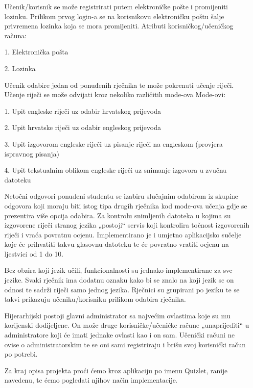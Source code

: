 Učenik/korisnik se može registrirati putem elektroničke pošte i promijeniti lozinku. Prilikom prvog login-a se na korisnikovu elektroničku poštu šalje privremena lozinka koja se mora promijeniti. 
Atributi korisničkog/učeničkog računa: 
\begin{packed_item}
\item 1. Elektronička pošta 
\item 2. Lozinka 
\end{packed_item}
Učenik odabire jedan od ponuđenih rječnika te može pokrenuti učenje riječi. 
Učenje riječi se može odvijati kroz nekoliko različitih mode-ova
Mode-ovi:
\begin{packed_item}
\item 1.	Upit engleske riječi uz odabir hrvatskog prijevoda 
\item 2.	Upit hrvatske riječi uz odabir engleskog prijevoda
\item 3.	Upit izgovorom engleske riječi uz pisanje riječi na engleskom (provjera ispravnog pisanja)
\item 4.	Upit tekstualnim oblikom engleske riječi uz snimanje izgovora u zvučnu datoteku
\end{packed_item}
Netočni odgovori ponuđeni studentu se izabiru slučajnim odabirom iz skupine odgovora koji moraju biti istog tipa drugih rječnika kod mode-ova učenja gdje se prezentira više opcija odabira. Za kontrolu snimljenih datoteka u kojima su izgovorene riječi stranog jezika „postoji“ servis koji kontrolira točnost izgovorenih riječi i vraća povratnu ocjenu. Implementirano je i umjetno aplikacijsko sučelje koje će prihvatiti takvu glasovnu datoteku te će povratno vratiti ocjenu na ljestvici od 1 do 10. 

Bez obzira koji jezik učili, funkcionalnosti su jednako implementirane za sve jezike. Svaki rječnik ima dodatnu oznaku kako bi se znalo na koji jezik se on odnosi te sadrži riječi samo jednog jezika. Rječnici su grupirani po jeziku te se takvi prikazuju učeniku/korisniku prilikom odabira rječnika. 

Hijerarhijski postoji glavni administrator sa najvećim ovlastima koje su mu korijenski dodijeljene. On može druge korisničke/učeničke račune „unaprijediti“ u administratore koji će imati jednake ovlasti kao i on sam. Učenički računi ne ovise o administratorskim te se oni sami registriraju i brišu svoj korisnički račun po potrebi.

Za kraj opisa projekta proći ćemo kroz aplikaciju po imenu Quizlet, ranije navedenu, te ćemo pogledati njihov način implementacije.

